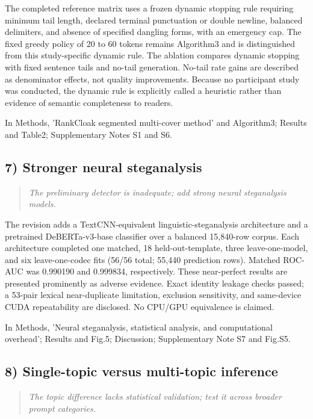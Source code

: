 \documentclass[11pt]{article}
\newenvironment{reviewcomment}{\begin{quote}\color{commentgray}\itshape}{\end{quote}}
\begin{document}
The completed reference matrix uses a frozen dynamic stopping rule requiring minimum tail length, declared terminal punctuation or double newline, balanced delimiters, and absence of specified dangling forms, with an emergency cap. The fixed greedy policy of 20 to 60 tokens remains Algorithm3 and is distinguished from this study-specific dynamic rule. The ablation compares dynamic stopping with fixed sentence tails and no-tail generation. No-tail rate gains are described as denominator effects, not quality improvements. Because no participant study was conducted, the dynamic rule is explicitly called a heuristic rather than evidence of semantic completeness to readers.

In Methods, 'RankCloak segmented multi-cover method' and Algorithm3; Results and Table2; Supplementary Notes S1 and S6.

\subsection*{7) Stronger neural steganalysis}
\begin{reviewcomment}
The preliminary detector is inadequate; add strong neural steganalysis models.
\end{reviewcomment}

The revision adds a TextCNN-equivalent linguistic-steganalysis architecture and a pretrained DeBERTa-v3-base classifier over a balanced 15,840-row corpus. Each architecture completed one matched, 18 held-out-template, three leave-one-model, and six leave-one-codec fits (56/56 total; 55,440 prediction rows). Matched ROC-AUC was 0.990190 and 0.999834, respectively. These near-perfect results are presented prominently as adverse evidence. Exact identity leakage checks passed; a 53-pair lexical near-duplicate limitation, exclusion sensitivity, and same-device CUDA repeatability are disclosed. No CPU/GPU equivalence is claimed.

In Methods, 'Neural steganalysis, statistical analysis, and computational overhead'; Results and Fig.5; Discussion; Supplementary Note S7 and Fig.S5.

\subsection*{8) Single-topic versus multi-topic inference}
\begin{reviewcomment}
The topic difference lacks statistical validation; test it across broader prompt categories.
\end{reviewcomment}
\end{document}
